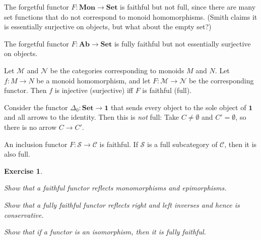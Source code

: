 \documentclass[article, a4paper, 11pt, oneside]{memoir}
\numberwithin{equation}{chapter}
\newcommand{\cat}[1]{\mathcal{#1}}
\newcommand{\ncat}[1]{\mathbf{#1}} %
\newcommand{\catSet}{\ncat{Set}}
\newcommand{\catAb}{\ncat{Ab}}
\newcommand{\catMon}{\ncat{Mon}}
\newcommand{\catC}{\cat{C}}
\newcommand{\catS}{\cat{S}}
\theoremstyle{myexample}
\theoremstyle{myexamplebreak}
\newtheorem{exercisebreak}[theorem]{Exercise}
\begin{document}
\newcommand{\catM}{\cat{M}}
\newcommand{\catN}{\cat{N}}
\newcommand{\catOne}{\ncat{1}}

\begin{examplebreak}
    \begin{enumexample}
        \item The forgetful functor $F \colon \catMon \to \catSet$ is faithful but not full, since there are many set functions that do not correspond to monoid homomorphisms. (Smith claims it is essentially surjective on objects, but what about the empty set?)

        \item The forgetful functor $F \colon \catAb \to \catSet$ is fully faithful but not essentially surjective on objects.

        \item Let $\catM$ and $\catN$ be the categories corresponding to monoids $M$ and $N$. Let $f \colon M \to N$ be a monoid homomorphism, and let $F \colon \catM \to \catN$ be the corresponding functor. Then $f$ is injective (surjective) iff $F$ is faithful (full).

        \item Consider the  functor $\Delta_0 \colon \catSet \to \catOne$ that sends every object to the sole object of $\catOne$ and all arrows to the identity. Then this is \emph{not} full: Take $C \neq \emptyset$ and $C' = \emptyset$, so there is no arrow $C \to C'$.

        \item An inclusion functor $F \colon \catS \to \catC$ is faithful. If $\catS$ is a full subcategory of $\catC$, then it is also full.
    \end{enumexample}
\end{examplebreak}


\begin{exercisebreak}
    \begin{enumexercise}
        \item Show that a faithful functor reflects monomorphisms and epimorphisms.

        \item Show that a fully faithful functor reflects right and left inverses and hence is conservative.

        \item Show that if a functor is an isomorphism, then it is fully faithful.
    \end{enumexercise}
\end{exercisebreak}
\end{document}
